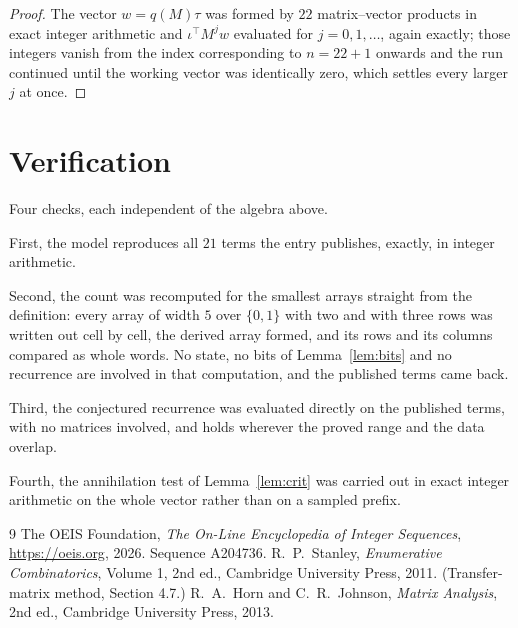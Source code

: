 \documentclass[11pt,a4paper]{article}
\theoremstyle{plain}
\theoremstyle{definition}
\begin{document}
\begin{proof}
The vector $w=q(M)\tau$ was formed by $22$ matrix--vector products in exact integer
arithmetic and $\iota^{\!\top}M^{j}w$ evaluated for $j=0,1,\dots$, again exactly; those
integers vanish from the index corresponding to $n=22+1$ onwards and the run continued
until the working vector was identically zero, which settles every larger $j$ at once.
\end{proof}

\section{Verification}

Four checks, each independent of the algebra above.

First, the model reproduces all $21$ terms the entry publishes, exactly, in integer
arithmetic.

Second, the count was recomputed for the smallest arrays straight from the definition: every
array of width $5$ over $\{0,1\}$ with two and with three rows was written out cell by cell,
the derived array formed, and its rows and its columns compared as whole words. No state, no
bits of Lemma~\ref{lem:bits} and no recurrence are involved in that computation, and the
published terms came back.

Third, the conjectured recurrence was evaluated directly on the published terms, with no
matrices involved, and holds wherever the proved range and the data overlap.

Fourth, the annihilation test of Lemma~\ref{lem:crit} was carried out in exact integer
arithmetic on the whole vector rather than on a sampled prefix.

\begin{thebibliography}{9}
 The OEIS Foundation, \emph{The On-Line Encyclopedia of Integer
Sequences}, \url{https://oeis.org}, 2026. Sequence A204736.
 R.~P.~Stanley, \emph{Enumerative Combinatorics}, Volume 1, 2nd ed.,
Cambridge University Press, 2011. (Transfer-matrix method, Section 4.7.)
 R.~A.~Horn and C.~R.~Johnson, \emph{Matrix Analysis}, 2nd ed., Cambridge
University Press, 2013.
\end{thebibliography}
\end{document}
